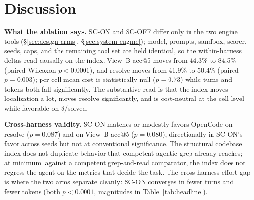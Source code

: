 %
%

\section{Discussion}
\label{sec:discussion}

\textbf{What the ablation says.} SC-ON and SC-OFF differ only in the two engine tools
(\S\ref{sec:design-arms}, \S\ref{sec:system-engine}); model, prompts, sandbox, scorer,
seeds, caps, and the remaining tool set are held identical, so the within-harness deltas
read causally on the index. View~B acc@5 moves from 44.3\% to 84.5\% (paired Wilcoxon
$p<0.0001$), and resolve moves from 41.9\% to 50.4\% (paired $p=0.003$); per-cell mean
cost is statistically null ($p=0.73$) while turns and tokens both fall significantly. The
substantive read is that the index moves localization a lot, moves resolve significantly,
and is cost-neutral at the cell level while favorable on \$/solved.

\textbf{Cross-harness validity.} SC-ON matches or modestly favors OpenCode on resolve
($p=0.087$) and on View~B acc@5 ($p=0.080$), directionally in SC-ON's favor across seeds
but not at conventional significance. The structural codebase index does not duplicate
behavior that competent agentic grep already reaches; at minimum, against a competent
grep-and-read comparator, the index does not regress the agent on the metrics that decide
the task. The cross-harness effort gap is where the two arms separate cleanly: SC-ON
converges in fewer turns and fewer tokens (both $p<0.0001$, magnitudes in
Table~\ref{tab:headline}).

